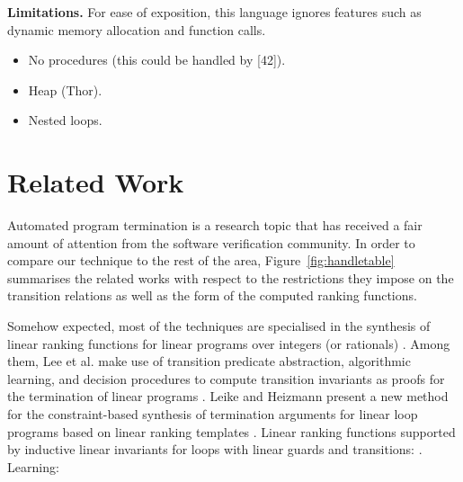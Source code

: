 \documentclass[preprint]{sigplanconf}
\theoremstyle{definition}
\begin{document}





{\bf Limitations.}
For ease of exposition, this language ignores features
such as dynamic memory allocation and function calls. 
\begin{itemize}
\item No procedures (this could be handled by [42]).
\item Heap (Thor).
\item Nested loops.
\end{itemize}

\section{Related Work}
Automated program termination is a research topic that has received a fair amount of attention from the software verification community.
In order to compare our technique to the rest of the area, 
Figure~\ref{fig:handletable} summarises the related works with respect to the restrictions they impose on the transition relations as well as the form of the computed ranking functions. 


Somehow expected, most of the techniques are specialised in the synthesis of linear ranking functions for linear programs over integers (or rationals) \cite{DBLP:conf/pldi/CookPR06,DBLP:conf/cav/LeeWY12,DBLP:conf/popl/Ben-AmramG13,DBLP:conf/vmcai/P04,DBLP:conf/atva/HeizmannHLP13,DBLP:conf/cav/BradleyMS05,DBLP:conf/tacas/CookSZ13}. 
Among them, 
Lee et al. make use of transition predicate abstraction, algorithmic learning, and decision procedures to compute transition
invariants as proofs for the termination of linear programs \cite{DBLP:conf/cav/LeeWY12}.
Leike and Heizmann present a new method for the constraint-based synthesis
of termination arguments for linear loop programs based on
linear ranking templates \cite{DBLP:conf/tacas/LeikeH14}.
Linear ranking functions supported by inductive linear invariants for loops with linear guards and transitions: \cite{DBLP:conf/cav/BradleyMS05}. 
Learning: \cite{DBLP:journals/corr/HeizmannHP14}
\end{document}
